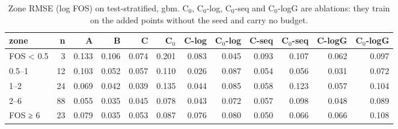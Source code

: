 \begin{table}[htbp]
\centering
\small
\setlength{\tabcolsep}{4pt}
\caption{Zone RMSE (log FOS) on test-stratified, gbm. C$_0$, C$_0$-log, C$_0$-seq and C$_0$-logG are ablations: they train on the added points without the seed and carry no budget.}
\label{tab:test-stratified__log-rmse:zones_log:gbm}
\begin{tabular}{lrrrrrrrrrrr}
\toprule
zone & n & A & B & C & C$_0$ & C-log & C$_0$-log & C-seq & C$_0$-seq & C-logG & C$_0$-logG \\
\midrule
FOS < 0.5 & 3 & 0.133 & 0.106 & 0.074 & 0.201 & 0.083 & 0.045 & 0.093 & 0.107 & 0.062 & 0.097 \\
0.5–1 & 12 & 0.103 & 0.052 & 0.057 & 0.110 & 0.026 & 0.087 & 0.054 & 0.056 & 0.031 & 0.072 \\
1–2 & 24 & 0.069 & 0.042 & 0.039 & 0.135 & 0.044 & 0.085 & 0.058 & 0.123 & 0.057 & 0.104 \\
2–6 & 88 & 0.055 & 0.035 & 0.045 & 0.078 & 0.043 & 0.072 & 0.057 & 0.098 & 0.048 & 0.089 \\
FOS ≥ 6 & 23 & 0.079 & 0.035 & 0.053 & 0.087 & 0.076 & 0.080 & 0.050 & 0.066 & 0.066 & 0.108 \\
\bottomrule
\end{tabular}
\end{table}
